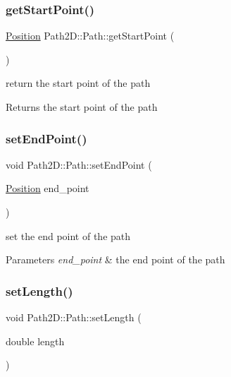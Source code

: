 \subsubsection{\texorpdfstring{get\+Start\+Point()}{getStartPoint()}}
{\footnotesize\ttfamily \mbox{\hyperlink{class_path2_d_1_1_element_1_1_position}{Position}} Path2\+D\+::\+Path\+::get\+Start\+Point (\begin{DoxyParamCaption}{ }\end{DoxyParamCaption})}



return the start point of the path 

\begin{DoxyReturn}{Returns}
the start point of the path 
\end{DoxyReturn}
\mbox{\label{class_path2_d_1_1_path_ae689288570f86c53e4e293ad506c9eb2}} 
\subsubsection{\texorpdfstring{set\+End\+Point()}{setEndPoint()}}
{\footnotesize\ttfamily void Path2\+D\+::\+Path\+::set\+End\+Point (\begin{DoxyParamCaption}\item[{\mbox{\hyperlink{class_path2_d_1_1_element_1_1_position}{Position}}}]{end\+\_\+point }\end{DoxyParamCaption})}



set the end point of the path 


\begin{DoxyParams}{Parameters}
{\em end\+\_\+point} & the end point of the path \\
\hline
\end{DoxyParams}
\mbox{\label{class_path2_d_1_1_path_aa49a4a999498f68d339e049fcc176776}} 
\subsubsection{\texorpdfstring{set\+Length()}{setLength()}}
{\footnotesize\ttfamily void Path2\+D\+::\+Path\+::set\+Length (\begin{DoxyParamCaption}\item[{double}]{length }\end{DoxyParamCaption})}



